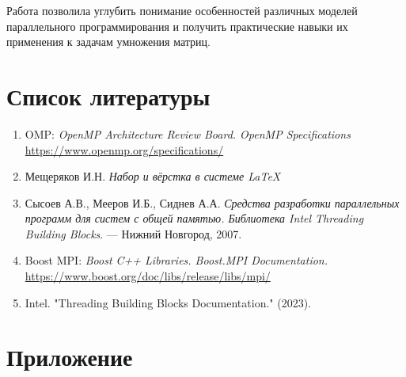 \documentclass[14pt,a4paper]{extarticle}
\begin{document}
Работа позволила углубить понимание особенностей различных моделей параллельного программирования и получить практические навыки их применения к задачам умножения матриц.
\newpage

\section{Список литературы}

\begin{enumerate}
    \item OMP: \textit{OpenMP Architecture Review Board. OpenMP Specifications}
    \url{https://www.openmp.org/specifications/}
    \item Мещеряков И.Н. \textit{Набор и вёрстка в системе \LaTeX}
    \item Сысоев А.В., Мееров И.Б., Сиднев А.А. \textit{Средства разработки параллельных программ для систем с общей памятью. Библиотека Intel Threading Building Blocks}. — Нижний Новгород, 2007.
    \item Boost MPI: \textit{Boost C++ Libraries. Boost.MPI Documentation.} \url{https://www.boost.org/doc/libs/release/libs/mpi/}
    \item Intel. "Threading Building Blocks Documentation." (2023).
\end{enumerate}
\newpage

\section{Приложение}
\end{document}
